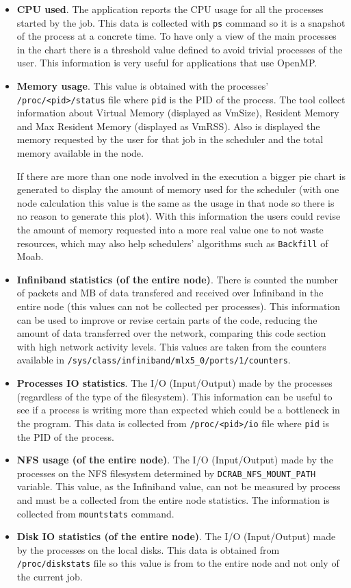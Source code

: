 \documentclass[10pt,a4paper]{report}
\begin{document}
\begin{itemize}
	\item \textbf{CPU used}. The application reports the CPU usage for all the processes started by the job. This data is collected with \verb+ps+ command so it is a snapshot of the process at a concrete time. To have only a view of the main processes in the chart there is a threshold value defined to avoid trivial processes of the user. This information is very useful for applications that use OpenMP.
	\item \textbf{Memory usage}. This value is obtained with the processes' \verb+/proc/<pid>/status+ file where \verb+pid+ is the PID of the process. The tool collect information about Virtual Memory (displayed as VmSize), Resident Memory and Max Resident Memory (displayed as VmRSS). Also is displayed the memory requested by the user for that job in the scheduler and the total memory available in the node.

	If there are more than one node involved in the execution a bigger pie chart is generated to display the amount of memory used for the scheduler (with one node calculation this value is the same as the usage in that node so there is no reason to generate this plot). With this information the users could revise the amount of memory requested into a more real value one to not waste resources, which may also help schedulers' algorithms such as \verb+Backfill+ of Moab.
	\item \textbf{Infiniband statistics (of the entire node)}. There is counted the number of packets and MB of data transfered and received over Infiniband in the entire node (this values can not be collected per processes). This information can be used to improve or revise certain parts of the code, reducing the amount of data transferred over the network, comparing this code section with high network activity levels. This values are taken from the counters available in \verb+/sys/class/infiniband/mlx5_0/ports/1/counters+.
	\item \textbf{Processes IO statistics}. The I/O (Input/Output) made by the processes (regardless of the type of the filesystem). This information can be useful to see if a process is writing more than expected which could be a bottleneck in the program. This data is collected from \verb+/proc/<pid>/io+ file where \verb+pid+ is the PID of the process.
	\item \textbf{NFS usage (of the entire node)}. The I/O (Input/Output) made by the processes on the NFS filesystem determined by \verb+DCRAB_NFS_MOUNT_PATH+ variable. This value, as the Infiniband value, can not be measured by process and must be a collected from the entire node statistics. The information is collected from \verb+mountstats+ command.
	\item \textbf{Disk IO statistics (of the entire node)}. The I/O (Input/Output) made by the processes on the local disks. This data is obtained from \verb+/proc/diskstats+ file so this value is from to the entire node and not only of the current job.
\end{itemize}
\end{document}
